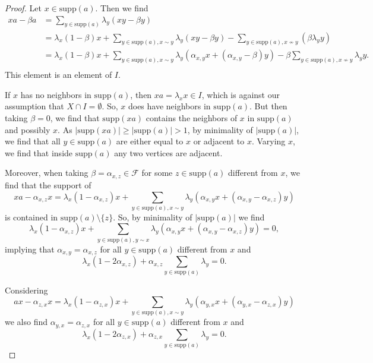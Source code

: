 \documentclass[oneside,a4paper]{amsart} %
\theoremstyle{definition}
\begin{document}
\begin{proof}
Let $x\in \mathrm{supp}(a)$. Then we find
$$\begin{array}{ll}
xa-\beta a
&=\displaystyle\sum_{y\in \mathrm{supp}(a)} \lambda_y (xy-\beta y)\\
&=\lambda_x(1-\beta) x+\displaystyle\sum_{y\in \mathrm{supp}(a),x\sim y} \lambda_y (xy-\beta y)-\displaystyle\sum_{y\in \mathrm{supp}(a),x\not\sim y} (\beta\lambda_y y)\\
&=\lambda_x(1-\beta) x+\displaystyle\sum_{y\in \mathrm{supp}(a),x\sim y} \lambda_y (\alpha_{x,y} x +(\alpha_{x,y}-\beta) y)-\beta\displaystyle\sum_{y\in \mathrm{supp}(a),x\not\sim y} \lambda_y y.\\
\end{array}$$
This element is an element of $I$.

If $x$ has no neighbors in $\mathrm{supp}(a)$, then $xa=\lambda_x x\in I$, which is against our assumption that $X\cap I=\emptyset$.
So, $x$ does have neighbors in $\mathrm{supp}(a)$.
But then taking $\beta=0$, we find that $\mathrm{supp}(xa)$ contains the neighbors of $x$ in $\mathrm{supp}(a)$ and possibly $x$. 
As $|\mathrm{supp}(xa)|\geq |\mathrm{supp}(a)|>1$, by minimality of $|\mathrm{supp}(a)|$,
we find that all $y\in \mathrm{supp}(a)$ are either equal to $x$ or adjacent to $x$.
Varying $x$, we find that inside  $\mathrm{supp}(a)$ any two vertices are adjacent.

Moreover, when taking $\beta=\alpha_{x,z}\in \mathcal{F}$ for some $z\in \mathrm{supp}(a)$ different from $x$, we find 
that the support of
$$xa-\alpha_{x,z} x=\lambda_x(1-\alpha_{x,z}) x+\displaystyle\sum_{y\in \mathrm{supp}(a),x\sim y} \lambda_y (\alpha_{x,y} x +(\alpha_{x,y}-\alpha_{x,z}) y)$$
is contained in $\mathrm{supp}(a)\setminus \{z\}$. So, by minimality of $|\mathrm{supp}(a)|$ we find
$$\lambda_x(1-\alpha_{x,z}) x+\displaystyle\sum_{y\in \mathrm{supp}(a),y\sim x} \lambda_y (\alpha_{x,y} x +(\alpha_{x,y}-\alpha_{x,z}) y)=0,$$
implying that $\alpha_{x,y}=\alpha_{x,z}$ for all $y\in \mathrm{supp}(a)$ different from $x$ and 
$$\lambda_x(1-2\alpha_{x,z})+ \alpha_{x,z}\displaystyle\sum_{y\in \mathrm{supp}(a)} \lambda_y=0.$$

Considering
$$ax-\alpha_{z,x} x=\lambda_x(1-\alpha_{z,x}) x+\displaystyle\sum_{y\in \mathrm{supp}(a),x\sim y} \lambda_y (\alpha_{y,x} x +(\alpha_{y,x}-\alpha_{z,x}) y)$$
we also find $\alpha_{y,x}=\alpha_{z,x}$ for all $y\in \mathrm{supp}(a)$ different from $x$ and 
$$\lambda_x(1-2\alpha_{z,x})+ \alpha_{z,x}\displaystyle\sum_{y\in \mathrm{supp}(a)} \lambda_y=0.$$


\end{proof}
\end{document}
